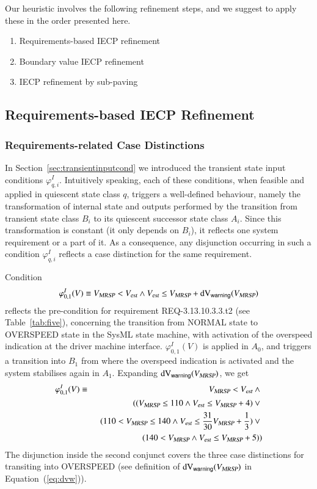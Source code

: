   

Our heuristic involves the following refinement steps, and we suggest to apply these in the order presented here.
\begin{enumerate}
\item Requirements-based IECP refinement
\item Boundary value IECP refinement
\item IECP refinement by sub-paving
\end{enumerate}

\subsection{Requirements-based IECP Refinement}

\subsubsection{Requirements-related Case Distinctions}

In Section~\ref{sec:transientinputcond} we introduced the transient state input 
conditions $\varphi_{q,i}^I$.
Intuitively speaking, each of these conditions, when feasible and applied in quiescent state class $q$, triggers a well-defined behaviour, namely the transformation of internal state and outputs performed by the transition from transient state class $B_i$ to its quiescent successor state class $A_i$. Since this transformation is constant (it only depends on $B_i$), it reflects one system requirement or a part of it. As a consequence, any disjunction occurring in such a 
condition $\varphi_{q,i}^I$ reflects a case distinction for the same requirement.

\begin{example}
Condition
$$
\varphi_{0,1}^I(V) \equiv {V_{\text{\sl MRSP}}} < {V_{\text{\sl est}}} \wedge {V_{\text{\sl est}}} \le {V_{\text{\sl MRSP}}} + \text{dV}_{\mathsf{warning}}({V_{\text{\sl MRSP}}})
$$
reflects the pre-condition for requirement REQ-3.13.10.3.3.t2 (see Table~\ref{tab:five}), concerning the transition from {\sf NORMAL} state to {\sf OVERSPEED} state in the SysML state machine, with  activation of the overspeed indication at the driver machine interface. $\varphi_{0,1}^I(V)$ is applied in $A_0$, and triggers a transition into $B_1$ from where the overspeed indication is activated and the system stabilises again in $A_1$.
Expanding $\text{dV}_{\mathsf{warning}}({V_{\text{\sl MRSP}}})$, we get
\begin{eqnarray*}
\varphi_{0,1}^I(V) &\equiv& {V_{\text{\sl MRSP}}} < {V_{\text{\sl est}}} \wedge {}
\\ & & (({V_{\text{\sl MRSP}}} \le 110 \wedge   {V_{\text{\sl est}}} \le {V_{\text{\sl MRSP}}} +4) \vee {}
\\ & & \ \ (110<{V_{\text{\sl MRSP}}} \le 140  \wedge {V_{\text{\sl est}}} \le \frac{31}{30}{V_{\text{\sl MRSP}}} +\frac{1}{3} ) \vee {}
\\ & & \ \ (140<{V_{\text{\sl MRSP}}} \wedge  {V_{\text{\sl est}}} \le {V_{\text{\sl MRSP}}} +5))
\end{eqnarray*}
The disjunction inside the second conjunct covers the three case distinctions for transiting into {\sf OVERSPEED} (see definition of $\text{dV}_{\mathsf{warning}}({V_{\text{\sl MRSP}}})$ in Equation~(\ref{eq:dvw})).
\xbox
\end{example}


